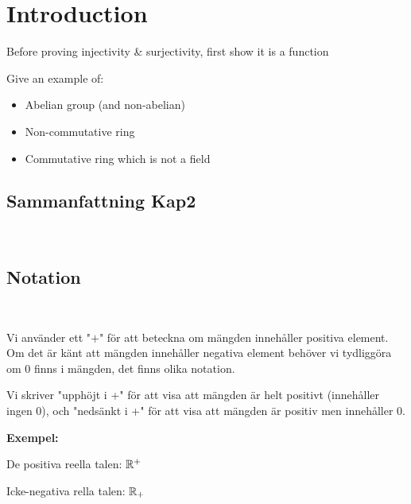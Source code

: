 \section{Introduction}\par
\noindent Before proving injectivity \& surjectivity, first show it is a function 
\par\bigskip
\noindent Give an example of:\par
\begin{itemize}
  \item Abelian group (and non-abelian)
  \item Non-commutative ring
  \item Commutative ring which is not a field
\end{itemize}
\newpage
\subsection{Sammanfattning Kap2}\hfill\\
\subsection{Notation}\hfill\\\par
\noindent Vi använder ett "$+$" för att beteckna om mängden innehåller positiva element. Om det är känt att mängden innehåller negativa element behöver vi tydliggöra om 0 finns i mängden, det finns olika notation.
\par\bigskip
\noindent Vi skriver "upphöjt i +" för att visa att mängden är helt positivt (innehåller ingen 0), och "nedsänkt i +" för att visa att mängden är positiv men innehåller 0.
\par\bigskip
\noindent\textbf{Exempel:}\par
\noindent De positiva reella talen: $\mathbb{R}^+$\par
\noindent Icke-negativa rella talen: $\mathbb{R}_+$
\par\bigskip
